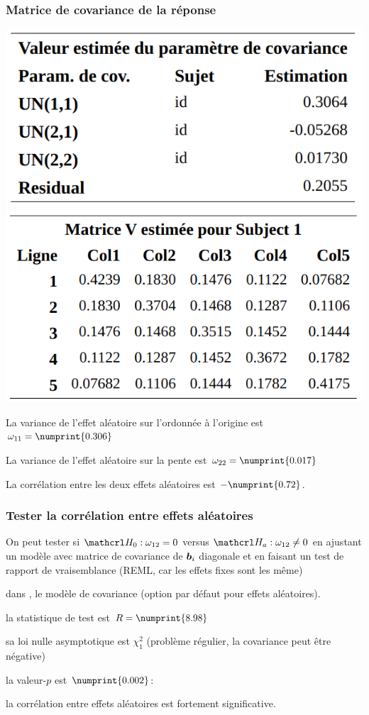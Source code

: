 \documentclass{beamer}
\begin{document}
\begin{frame}
 \frametitle{Matrice de covariance de la réponse}
 \begin{center}
\includegraphics[width = 0.47\linewidth]{img/c6/diapos7-e25}
\includegraphics[width = 0.5\linewidth]{img/c6/diapos7-e24}
\end{center}
\bi \item 
La variance de l'effet aléatoire sur l'ordonnée à l'origine est $\omega_{11}=\numprint{0.306}$
\item La variance de l'effet aléatoire sur la pente est $\omega_{22}=\numprint{0.017}$
\item La corrélation entre les deux effets aléatoires est $-\numprint{0.72}$.
\ei
\end{frame}
\begin{frame}
\frametitle{Tester la corrélation entre effets aléatoires}
\bi
\item On peut tester si  $\Hy_0: \omega_{12}=0$ versus $\Hy_a: \omega_{12} \neq 0$ en ajustant un modèle avec matrice de covariance de $\boldsymbol {b}_i$ diagonale et en faisant un test de rapport de vraisemblance (REML, car les effets fixes sont les même) \bi 
\item dans \SASlang{}, le modèle de covariance  (option par défaut pour effets aléatoires).
\item la statistique de test est $R=\numprint{8.98}$ 
\item sa loi nulle asymptotique est $\chi^2_1$ (problème régulier, la covariance peut être négative)
\item la valeur-$p$ est $\numprint{0.002}$:
\item la corrélation entre effets aléatoires est fortement significative. \ei
\ei
\end{frame}
\end{document}

